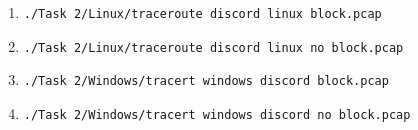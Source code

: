 \documentclass{article}
\begin{document}
\begin{enumerate}
    \item \texttt{./Task 2/Linux/traceroute discord linux block.pcap}
    \item \texttt{./Task 2/Linux/traceroute discord linux no block.pcap}
    \item \texttt{./Task 2/Windows/tracert windows discord block.pcap}
    \item \texttt{./Task 2/Windows/tracert windows discord no block.pcap}

\end{enumerate}

\nocite{*}


\end{document}
